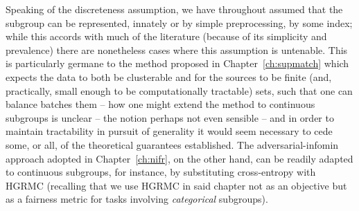 Speaking of the discreteness assumption, we have throughout assumed that the subgroup can be
represented, innately or by simple preprocessing, by some index; while this accords with much of
the literature (because of its simplicity and prevalence) there are nonetheless cases where this
assumption is untenable.
%
This is particularly germane to the method proposed in Chapter~\ref{ch:supmatch} which expects the
data to both be clusterable and for the sources to be finite (and, practically, small enough to be
computationally tractable) sets, such that one can balance batches \wrt{} them -- how one might
extend the method to continuous subgroups is unclear -- the notion perhaps not even sensible -- and
in order to maintain tractability in pursuit of generality it would seem necessary to cede some, or
all, of the theoretical guarantees established.
%
The adversarial-infomin approach adopted in Chapter~\ref{ch:nifr}, on the other hand, can be
readily adapted to continuous subgroups, for instance, by substituting cross-entropy with
\ac{HGRMC} (recalling that we use \ac{HGRMC} in said chapter not as an objective but as a fairness
metric for tasks involving \emph{categorical} subgroups).

